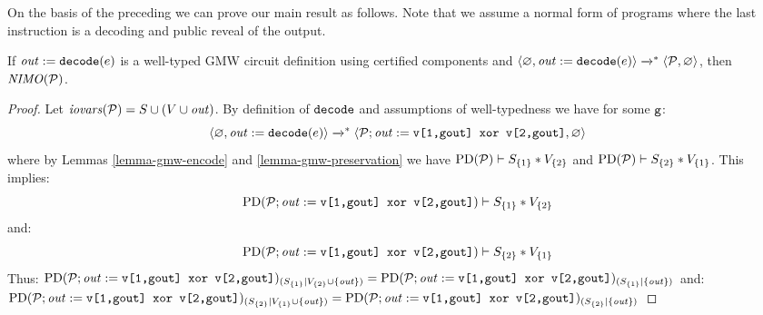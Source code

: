 On the basis of the preceding we can prove our main result as
follows. Note that we assume a normal form of programs where the last
instruction is a decoding and public reveal of the output.
\begin{theorem}
  \label{theorem-gmw-NIMO}
  If $\mathit{out} := \texttt{decode}(e)$ is a well-typed GMW circuit
  definition using certified components and
  $\langle \varnothing,\mathit{out} := \texttt{decode}(e) \rangle \xrightarrow{}^{*}
  \langle \mathcal{P},\varnothing \rangle$, then $\mathit{NIMO}(\mathcal{P})$.
\end{theorem}
\begin{proof}
  Let $\mathit{iovars}(\mathcal{P}) = S \cup (V \cup \mathit{out})$. By definition of $\texttt{decode}$
  and assumptions of well-typedness we have for some $\texttt{g}$:
  $$
  \langle \varnothing,\mathit{out} := \texttt{decode}(e) \rangle \xrightarrow{}^{*}
  \langle \mathcal{P};\mathit{out} := \texttt{v[1,gout] xor v[2,gout]},\varnothing \rangle
  $$
  where by Lemmas \ref{lemma-gmw-encode} and \ref{lemma-gmw-preservation} we
  have $\mathrm{PD}(\mathcal{P}) \vdash S_{\{1\}} * V_{\{2\}}$ and
  $\mathrm{PD}(\mathcal{P}) \vdash S_{\{2\}} * V_{\{1\}}$. This implies:
  $$\mathrm{PD}(\mathcal{P};\mathit{out} := \texttt{v[1,gout] xor v[2,gout]}) \vdash S_{\{1\}} * V_{\{2\}}$$ and:
  $$\mathrm{PD}(\mathcal{P};\mathit{out} := \texttt{v[1,gout] xor v[2,gout]}) \vdash S_{\{2\}} * V_{\{1\}}$$
  Thus:
  $\mathrm{PD}(\mathcal{P};\mathit{out} := \texttt{v[1,gout] xor v[2,gout]})_{({S_{\{1\}}}|{V_{\{2\}} \cup \{ \mathit{out} \}})}
  = \mathrm{PD}(\mathcal{P};\mathit{out} := \texttt{v[1,gout] xor v[2,gout]})_{({S_{\{1\}}}|{\{ \mathit{out} \}})}$
  and:
  $\mathrm{PD}(\mathcal{P};\mathit{out} := \texttt{v[1,gout] xor v[2,gout]})_{({S_{\{2\}}}|{V_{\{1\}} \cup \{ \mathit{out} \}})}
  = \mathrm{PD}(\mathcal{P};\mathit{out} := \texttt{v[1,gout] xor v[2,gout]})_{({S_{\{2\}}}|{\{ \mathit{out} \}})}$
\end{proof}
